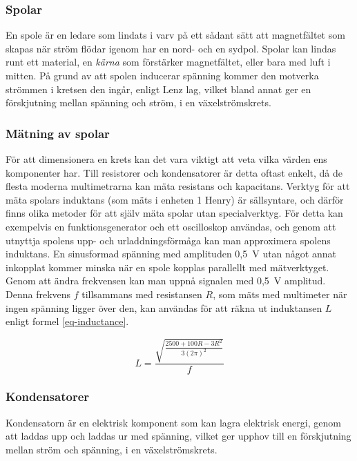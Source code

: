 \documentclass[a4paper]{article}
\begin{document}
\begin{sloppypar}
    \subsubsection{Spolar}
    En spole är en ledare som lindats i varv på ett sådant sätt att magnetfältet som skapas när ström flödar igenom har en nord- och en sydpol.
    Spolar kan lindas runt ett material, en \textit{kärna} som förstärker magnetfältet, eller bara med luft i mitten.
    På grund av att spolen inducerar spänning kommer den motverka strömmen i kretsen den ingår, enligt Lenz lag, vilket bland annat ger en förskjutning mellan spänning och ström, i en växelströmskrets.~\cite{digilar}
    \subsubsection{Mätning av spolar}
    För att dimensionera en krets kan det vara viktigt att veta vilka värden ens komponenter har.
    Till resistorer och kondensatorer är detta oftast enkelt, då de flesta moderna multimetrarna kan mäta resistans och kapacitans.
    Verktyg för att mäta spolars induktans (som mäts i enheten 1 Henry) är sällsyntare, och därför finns olika metoder för att själv mäta spolar utan specialverktyg.
    För detta kan exempelvis en funktionsgenerator och ett oscilloskop användas, och genom att utnyttja spolens upp- och urladdningsförmåga kan man approximera spolens induktans.
    En sinusformad spänning med amplituden 0,5~V utan något annat inkopplat kommer minska när en spole kopplas parallellt med mätverktyget. Genom att ändra frekvensen kan man uppnå signalen med 0,5~V amplitud.
    Denna frekvens $f$ tillsammans med resistansen $R$, som mäts med multimeter när ingen spänning ligger över den, kan användas för att räkna ut induktansen $L$ enligt formel \ref{eq-inductance}.~\cite{MeasureInductor}

    \begin{equation}
        \label{eq-inductance}
        L = \frac{\sqrt{\frac{2500+100R-3R^2}{3(2\pi)^2}}}{f}
    \end{equation}


    \subsubsection{Kondensatorer}
    Kondensatorn är en elektrisk komponent som kan lagra elektrisk energi, genom att laddas upp och laddas ur med spänning, vilket ger upphov till en förskjutning mellan ström och spänning, i en växelströmskrets.~\cite{digilar}


\end{sloppypar}
\end{document}
